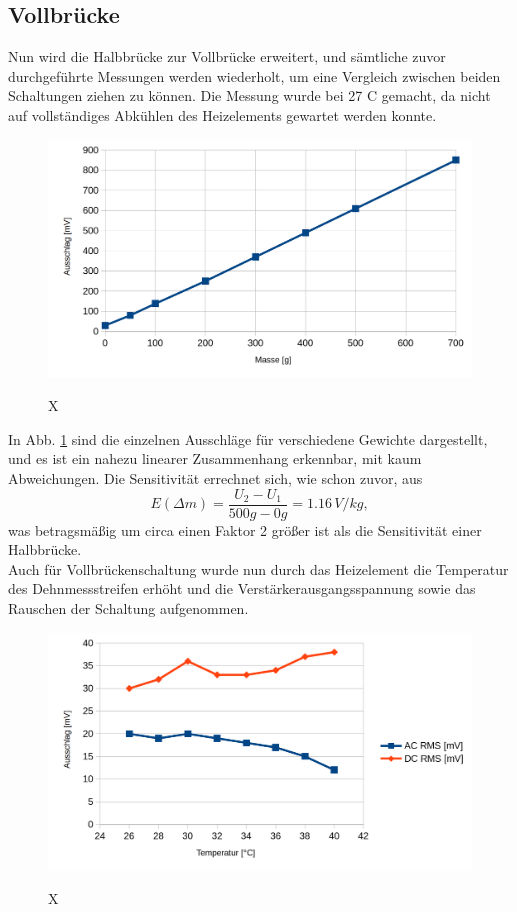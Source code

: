 \subsection{Vollbrücke}
Nun wird die Halbbrücke zur Vollbrücke erweitert, und sämtliche zuvor durchgeführte Messungen werden wiederholt, um eine Vergleich zwischen beiden Schaltungen ziehen zu können. Die Messung wurde bei 27 C gemacht, da nicht auf vollständiges Abkühlen des Heizelements gewartet werden konnte. 
\begin{figure}[H]
	\includegraphics[width=\textwidth]{./img/ch3/GewichtsmessungVollbruecke_3_3_3.png}
	\label{fig:gewicht_vb}
	\caption{X}
\end{figure}
In Abb. \ref{fig:gewicht_vb} sind die einzelnen Ausschläge für verschiedene Gewichte dargestellt, und es ist ein nahezu linearer Zusammenhang erkennbar, mit kaum Abweichungen. Die Sensitivität errechnet sich, wie schon zuvor, aus 
\begin{equation}
	E(\Delta m)=\frac{U_2-U_1}{500g-0g}=1.16\,V/kg,
\end{equation}
was betragsmäßig um circa einen Faktor 2 größer ist als die Sensitivität einer Halbbrücke. \\
Auch für Vollbrückenschaltung wurde nun durch das Heizelement die Temperatur des Dehnmessstreifen erhöht und die Verstärkerausgangsspannung sowie das Rauschen der Schaltung aufgenommen. 
\begin{figure}[H]
	\includegraphics[width=\textwidth]{./img/ch3/TemperaturmessungVollbruecke_3_3_3.png}
	\label{fig:temp_vb}
	\caption{X}
\end{figure} \noindent
